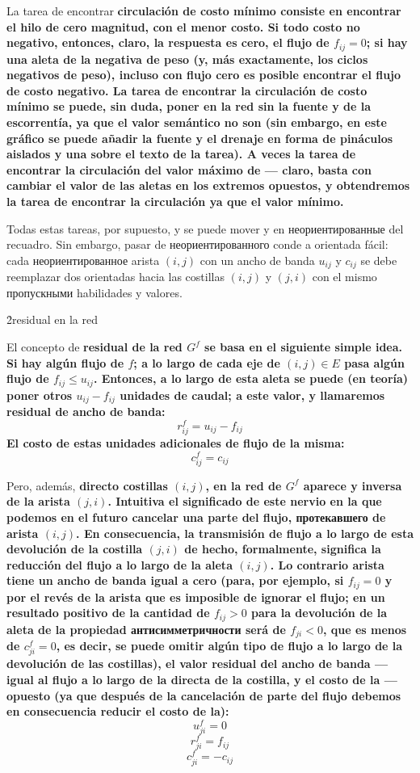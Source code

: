 La tarea de encontrar \bf{circulación de costo mínimo} consiste en encontrar el hilo de cero magnitud, con el menor costo. Si todo costo no negativo, entonces, claro, la respuesta es cero, el flujo de $f_{ij}=0$; si hay una aleta de la negativa de peso (y, más exactamente, los ciclos negativos de peso), incluso con flujo cero es posible encontrar el flujo de costo negativo. La tarea de encontrar la circulación de costo mínimo se puede, sin duda, poner en la red sin la fuente y de la escorrentía, ya que el valor semántico no son (sin embargo, en este gráfico se puede añadir la fuente y el drenaje en forma de pináculos aislados y una sobre el texto de la tarea). A veces la tarea de encontrar la circulación del valor máximo de --- claro, basta con cambiar el valor de las aletas en los extremos opuestos, y obtendremos la tarea de encontrar la circulación ya que el valor mínimo.

Todas estas tareas, por supuesto, y se puede mover y en неориентированные del recuadro. Sin embargo, pasar de неориентированного conde a orientada fácil: cada неориентированное arista $(i,j)$ con un ancho de banda $u_{ij}$ y $c_{ij}$ se debe reemplazar dos orientadas hacia las costillas $(i,j)$ y $(j,i)$ con el mismo пропускными habilidades y valores.

\h2{residual en la red}

El concepto de \bf{residual de la red} $G^f$ se basa en el siguiente simple idea. Si hay algún flujo de $f$; a lo largo de cada eje de $(i,j) \in E$ pasa algún flujo de $f_{ij} \le u_{ij}$. Entonces, a lo largo de esta aleta se puede (en teoría) poner otros $u_{ij} - f_{ij}$ unidades de caudal; a este valor, y llamaremos \bf{residual de ancho de banda}:
$$ r_{ij}^f = u_{ij} - f_{ij} $$
El costo de estas unidades adicionales de flujo de la misma:
$$ c_{ij}^f = c_{ij} $$

Pero, además, \bf{directo} costillas $(i,j)$, en la red de $G^f$ aparece y \bf{inversa de la arista} $(j,i)$. Intuitiva el significado de este nervio en la que podemos en el futuro cancelar una parte del flujo, протекавшего de arista $(i,j)$. En consecuencia, la transmisión de flujo a lo largo de esta devolución de la costilla $(j,i)$ de hecho, formalmente, significa la reducción del flujo a lo largo de la aleta $(i,j)$. Lo contrario arista tiene un ancho de banda igual a cero (para, por ejemplo, si $f_{ij}=0$ y por el revés de la arista que es imposible de ignorar el flujo; en un resultado positivo de la cantidad de $f_{ij}>0$ para la devolución de la aleta de la propiedad антисимметричности será de $f_{ji}<0$, que es menos de $c_{ji}^f = 0$, es decir, se puede omitir algún tipo de flujo a lo largo de la devolución de las costillas), el valor residual del ancho de banda --- igual al flujo a lo largo de la directa de la costilla, y el costo de la --- opuesto (ya que después de la cancelación de parte del flujo debemos en consecuencia reducir el costo de la):
$$ u_{ji}^f = 0 $$
$$ r_{ji}^f = f_{ij} $$
$$ c_{ji}^f = -c_{ij} $$

